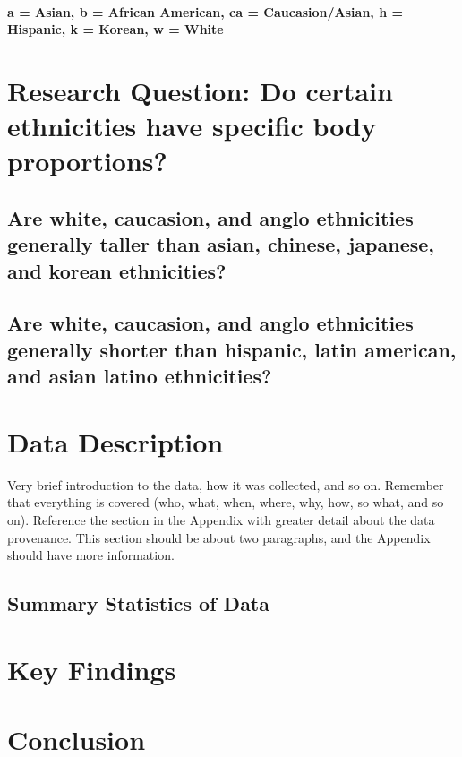 \documentclass[]{article}
\begin{document}
\paragraph{a = Asian, b = African American, ca = Caucasion/Asian, h = Hispanic, k = Korean, w = White}
\label{sec:into}

\section{Research Question:  Do certain ethnicities have specific body proportions?}
\label{sec:rq}

\subsection{Are white, caucasion, and anglo ethnicities generally taller than asian, chinese, japanese, and korean ethnicities?}
\label{sec:rq2}

\subsection{Are white, caucasion, and anglo ethnicities generally shorter than hispanic, latin american, and asian latino ethnicities?}
\label{sec:rq3}

\section{Data Description}
\label{sec:data}

Very brief introduction to the data, how it was collected, and so on.
Remember that everything is covered (who, what, when, where, why, how,
so what, and so on). Reference the section in the Appendix with greater
detail about the data provenance. This section should be about two
paragraphs, and the Appendix should have more information.

\subsection{Summary Statistics of Data}
\label{sec:data-summary}



\section{Key Findings}
\label{sec:findings}

\section{Conclusion}
\label{sec:conclusion}
\end{document}
